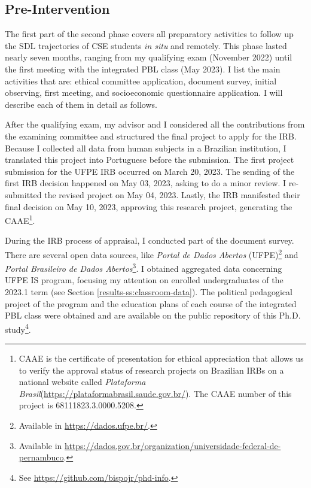 \subsection{Pre-Intervention}
\label{phd-route-ss:pre-int}

The first part of the second phase covers all preparatory activities to follow up the \gls{SDL} trajectories of CSE students \textit{in situ} and remotely. This phase lasted nearly seven months, ranging from my qualifying exam (November 2022) until the first meeting with the integrated \gls{PBL} class (May 2023). I list the main activities that are: ethical committee application, document survey, initial observing, first meeting, and socioeconomic questionnaire application.  I will describe each of them in detail as follows.

After the qualifying exam, my advisor and I considered all the contributions from the examining committee and structured the final project to apply for the \gls{IRB}. Because I collected all data from human subjects in a Brazilian institution, I translated this project into Portuguese before the submission. The first project submission for the \gls{UFPE} \gls{IRB} occurred on March 20, 2023. The sending of the first \gls{IRB} decision happened on May 03, 2023, asking to do a minor review. I re-submitted the revised project on May 04, 2023. Lastly, the \gls{IRB} manifested their final decision on May 10, 2023, approving this research project, generating the  \gls{CAAE}\footnote{CAAE is the certificate of presentation for ethical appreciation that allows us to verify the approval status of research projects on Brazilian \gls{IRB}s on a national website called \textit{Plataforma Brasil}(\url{https://plataformabrasil.saude.gov.br/}). The \gls{CAAE} number of this project is 68111823.3.0000.5208.}.

During the \gls{IRB} process of appraisal, I conducted part of the document survey. There are several open data sources, like \textit{Portal de Dados Abertos} (\gls{UFPE})\footnote{Available in \url{https://dados.ufpe.br/}.} and \textit{Portal Brasileiro de Dados Abertos}\footnote{Available in \url{https://dados.gov.br/organization/universidade-federal-de-pernambuco}.}. I obtained aggregated data concerning \gls{UFPE} \gls{IS} program, focusing my attention on enrolled undergraduates of the 2023.1 term (see Section \ref{results-ss:classroom-data}). The political pedagogical project of the program and the education plans of each course of the integrated \gls{PBL} class were obtained and are available on the public repository of this \gls{Ph.D.} study\footnote{See \url{https://github.com/bispojr/phd-info}.}. 

